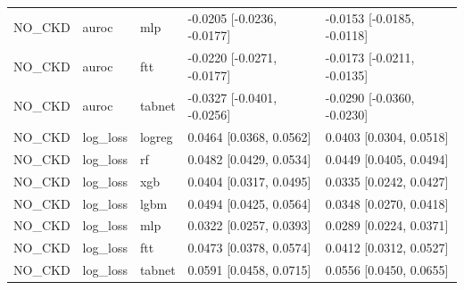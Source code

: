 \begin{table}[t]
\begin{tabular}{lllll}
NO\_CKD & auroc & mlp & -0.0205 [-0.0236, -0.0177] & -0.0153 [-0.0185, -0.0118] \\
NO\_CKD & auroc & ftt & -0.0220 [-0.0271, -0.0177] & -0.0173 [-0.0211, -0.0135] \\
NO\_CKD & auroc & tabnet & -0.0327 [-0.0401, -0.0256] & -0.0290 [-0.0360, -0.0230] \\
NO\_CKD & log\_loss & logreg & 0.0464 [0.0368, 0.0562] & 0.0403 [0.0304, 0.0518] \\
NO\_CKD & log\_loss & rf & 0.0482 [0.0429, 0.0534] & 0.0449 [0.0405, 0.0494] \\
NO\_CKD & log\_loss & xgb & 0.0404 [0.0317, 0.0495] & 0.0335 [0.0242, 0.0427] \\
NO\_CKD & log\_loss & lgbm & 0.0494 [0.0425, 0.0564] & 0.0348 [0.0270, 0.0418] \\
NO\_CKD & log\_loss & mlp & 0.0322 [0.0257, 0.0393] & 0.0289 [0.0224, 0.0371] \\
NO\_CKD & log\_loss & ftt & 0.0473 [0.0378, 0.0574] & 0.0412 [0.0312, 0.0527] \\
NO\_CKD & log\_loss & tabnet & 0.0591 [0.0458, 0.0715] & 0.0556 [0.0450, 0.0655] \\
\bottomrule
\end{tabular}
\end{table}
